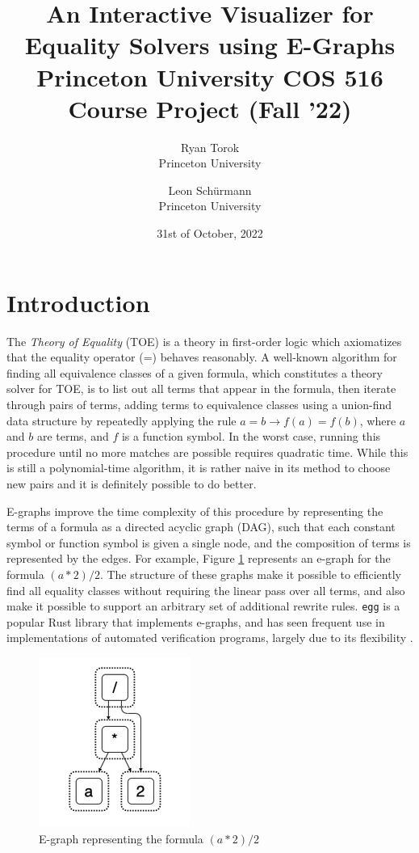 \documentclass[letterpaper,twocolumn,10pt]{article}
\date{31st of October, 2022}
\title{%
  {\Large \bf An Interactive Visualizer for Equality Solvers using E-Graphs}\\%
  {\large Princeton University COS 516 Course Project (Fall '22)}%
}
\author{ {\rm Ryan Torok}\\ Princeton University \and {\rm Leon Sch\"urmann}\\ Princeton University
} %
\begin{document}
\maketitle

\section{Introduction}

The \textit{Theory of Equality} (TOE) is a theory in first-order logic which axiomatizes that the equality operator (=) behaves reasonably\cite{bm}. A well-known algorithm for finding all equivalence classes of a given formula, which constitutes a theory solver for TOE, is to list out all terms that appear in the formula, then iterate through pairs of terms, adding terms to equivalence classes using a union-find data structure by repeatedly applying the rule $a = b \rightarrow f(a) = f(b)$, where $a$ and $b$ are terms, and $f$ is a function symbol. In the worst case, running this procedure until no more matches are possible requires quadratic time. While this is still a polynomial-time algorithm, it is rather naive in its method to choose new pairs and it is definitely possible to do better.

E-graphs \cite{egraphs} improve the time complexity of this procedure by representing the terms of a formula as a directed acyclic graph (DAG), such that each constant symbol or function symbol is given a single node, and the composition of terms is represented by the edges. For example, Figure \ref{fig:egraph} represents an e-graph for the formula $(a * 2) / 2$. The structure of these graphs make it possible to efficiently find all equality classes without requiring the linear pass over all terms, and also make it possible to support an arbitrary set of additional rewrite rules. \texttt{egg} is a popular Rust library that implements e-graphs, and has seen frequent use in implementations of automated verification programs, largely due to its flexibility \cite{egg}.

\begin{figure}[t]
    \centering
    \includegraphics[width=.5\columnwidth]{egraph.png}
    \caption{E-graph representing the formula $(a * 2) / 2$}
    \label{fig:egraph}
\end{figure}
\end{document}
